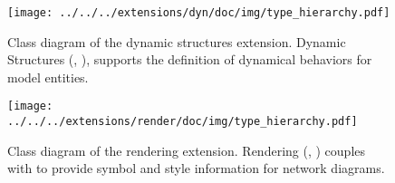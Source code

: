 \begin{figure}[hb]
 \centering
 \vspace*{2ex}
 \texttt{[image: ../../../extensions/dyn/doc/img/type\_hierarchy.pdf]}
 \caption[Class diagram of the dynamic structures extension]{Class diagram of the dynamic structures extension. Dynamic Structures (, \cite{Gomez2014}), supports the definition of dynamical behaviors for model entities.
}
 \label{fig:dyn}
\end{figure}


\begin{figure}[hb]
 \centering
 \vspace*{2ex}
 \texttt{[image: ../../../extensions/render/doc/img/type\_hierarchy.pdf]}
 \caption[Class diagram of the rendering extension.]{Class diagram of the rendering extension. Rendering (, \cite{gauges2006}) couples with \cite{Layout} to provide symbol and style information for network diagrams.}
 \label{fig:render}
\end{figure}


